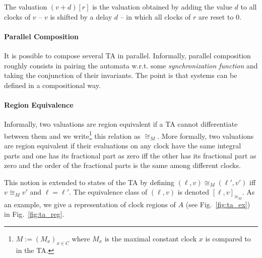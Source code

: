 \documentclass[11pt]{article}
\theoremstyle{definition}
\theoremstyle{remark}
\theoremstyle{definition}
\begin{document}
The valuation $(v+d)[r]$ is the valuation obtained by adding the value $d$ to all clocks of $v$ -- $v$ is shifted by a delay $d$ -- in which all clocks of $r$ are reset to $0$.



\paragraph{Parallel Composition}\label{par:ta_parcomp}
It is possible to compose several TA in parallel. Informally, parallel composition roughly consists in pairing the automata w.r.t. some \emph{synchronization function} and taking the conjunction of their invariants. The point is that systems can be defined in a compositional way.

\paragraph{Region Equivalence}\label{par:ta_regeq}
Informally, two valuations are region equivalent if a TA cannot differentiate between them and we write\footnote{$M := (M_x)_{x \in C}$ where $M_x$ is the maximal constant clock $x$ is compared to in the TA.} this relation as $\cong_M$.
More formally, two valuations are region equivalent if their evaluations on any clock have the same integral parts and one has its fractional part as zero iff the other has its fractional part as zero and the order of the fractional parts is the same among different clocks.

This notion is extended to states of the TA by defining $(\ell, v) \cong_M (\ell', v')$ iff $v \cong_M v'$ and $\ell = \ell'$. The equivalence class of $(\ell, v)$ is denoted $[\ell, v]_{\cong_M}$.
As an example, we give a representation of clock regions of $A$ (see Fig.~\ref{fig:ta_ex}) in Fig.~\ref{fig:ta_reg}.
\end{document}
